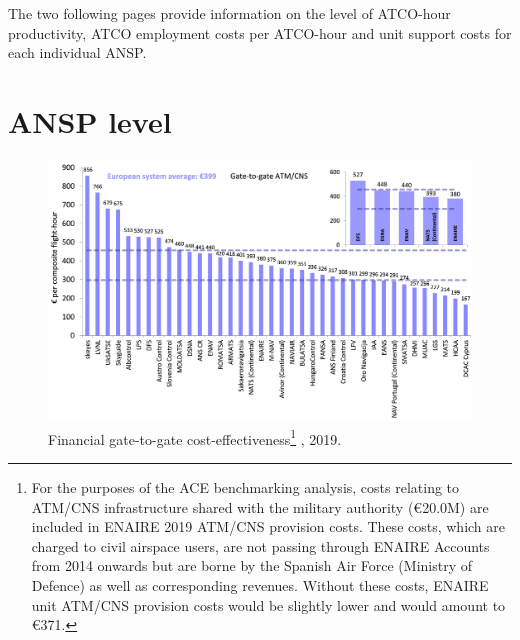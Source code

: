 \documentclass[
]{book}
\begin{document}
The two following pages provide information on the level of ATCO-hour productivity, ATCO employment costs per ATCO-hour and unit support costs for each individual ANSP.

\hypertarget{ansp-level}{%
\section{ANSP level}\label{ansp-level}}



\begin{figure}

{\centering \includegraphics[width=1\linewidth]{figures/Figure 4-4} 

}

\caption{Financial gate-to-gate cost-effectiveness\footnote{For the purposes of the ACE benchmarking analysis, costs relating to ATM/CNS infrastructure shared with the military authority (€20.0M) are included in ENAIRE 2019 ATM/CNS provision costs. These costs, which are charged to civil airspace users, are not passing through ENAIRE Accounts from 2014 onwards but are borne by the Spanish Air Force (Ministry of Defence) as well as corresponding revenues. Without these costs, ENAIRE unit ATM/CNS provision costs would be slightly lower and would amount to €371.} , 2019.}\label{fig:figure14}
\end{figure}
\end{document}
